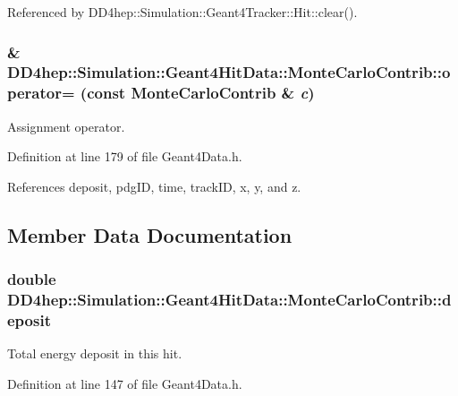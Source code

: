 Referenced by DD4hep::Simulation::Geant4Tracker::Hit::clear().\hypertarget{class_d_d4hep_1_1_simulation_1_1_geant4_hit_data_1_1_monte_carlo_contrib_a99c408c786e0d76e316f223e08b194ed}{
\subsubsection[{operator=}]{\& DD4hep::Simulation::Geant4HitData::MonteCarloContrib::operator= (const {\bf MonteCarloContrib} \& {\em c})}}
\label{class_d_d4hep_1_1_simulation_1_1_geant4_hit_data_1_1_monte_carlo_contrib_a99c408c786e0d76e316f223e08b194ed}


Assignment operator. 

Definition at line 179 of file Geant4Data.h.

References deposit, pdgID, time, trackID, x, y, and z.

\subsection{Member Data Documentation}
\hypertarget{class_d_d4hep_1_1_simulation_1_1_geant4_hit_data_1_1_monte_carlo_contrib_a34177a48fce1f52d1b58d6ab47e1cacc}{
\subsubsection[{deposit}]{\setlength{\rightskip}{0pt plus 5cm}double {\bf DD4hep::Simulation::Geant4HitData::MonteCarloContrib::deposit}}}
\label{class_d_d4hep_1_1_simulation_1_1_geant4_hit_data_1_1_monte_carlo_contrib_a34177a48fce1f52d1b58d6ab47e1cacc}


Total energy deposit in this hit. 

Definition at line 147 of file Geant4Data.h.

